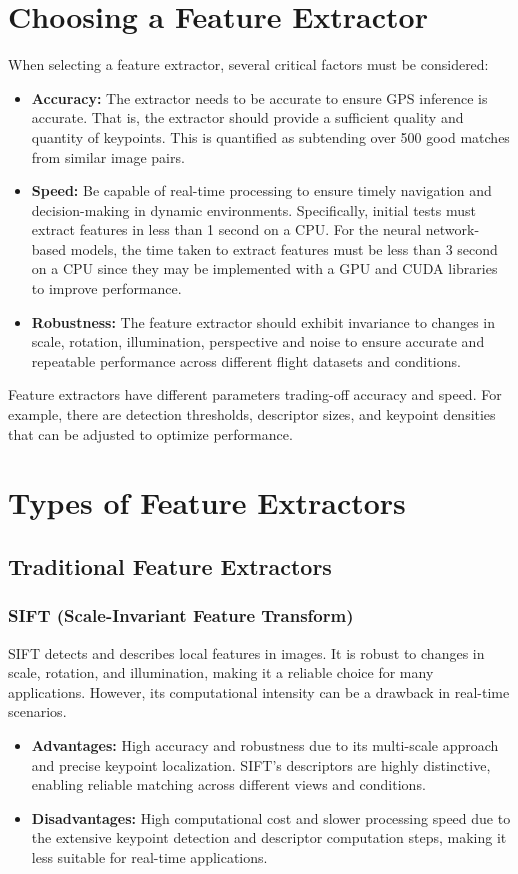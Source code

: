 \section{Choosing a Feature Extractor}
When selecting a feature extractor, several critical factors must be considered:
\begin{itemize}
    \item \textbf{Accuracy:} The extractor needs to be accurate to ensure GPS inference is accurate. That is, the extractor should provide a sufficient quality and quantity of keypoints. This is quantified as subtending over 500 good matches from similar image pairs. 
    \item \textbf{Speed:} Be capable of real-time processing to ensure timely navigation and decision-making in dynamic environments. Specifically, initial tests must extract features in less than 1 second on a CPU. For the neural network-based models, the time taken to extract features must be less than 3 second on a CPU since they may be implemented with a GPU and CUDA libraries to improve performance. 
    \item \textbf{Robustness:} The feature extractor should exhibit invariance to changes in scale, rotation, illumination, perspective and noise to ensure accurate and repeatable performance across different flight datasets and conditions.
\end{itemize}

Feature extractors have different parameters trading-off accuracy and speed. For example, there are detection thresholds, descriptor sizes, and keypoint densities that can be adjusted to optimize performance. 

\section{Types of Feature Extractors}
\subsection{Traditional Feature Extractors}
\subsubsection{SIFT (Scale-Invariant Feature Transform)}
SIFT detects and describes local features in images. It is robust to changes in scale, rotation, and illumination, making it a reliable choice for many applications. However, its computational intensity can be a drawback in real-time scenarios.
\begin{itemize}
    \item \textbf{Advantages:} High accuracy and robustness due to its multi-scale approach and precise keypoint localization. SIFT's descriptors are highly distinctive, enabling reliable matching across different views and conditions.
    \item \textbf{Disadvantages:} High computational cost and slower processing speed due to the extensive keypoint detection and descriptor computation steps, making it less suitable for real-time applications.
\end{itemize}


